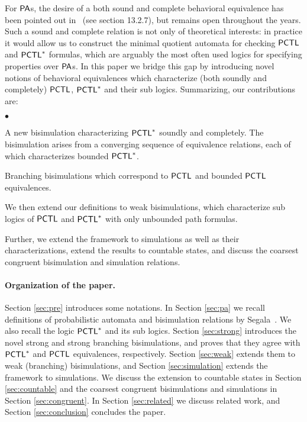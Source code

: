 \documentclass{LMCS}
\newcommand{\PA}{{\sf PA}}
\newcommand{\PCTL}{{\sf PCTL}}
\begin{document}
For $\PA$s, the desire of a both sound and complete behavioral
equivalence has been pointed out in~\cite{Segala-thesis} (see section
13.2.7), but remains open throughout the years.
Such a sound and complete relation is not only of theoretical interests: in practice
it would allow us to construct the minimal quotient automata for
checking $\PCTL$ and $\PCTL^{*}$ formulas, which are arguably the most often used
logics for specifying properties over $\PA$s.
 In this paper we bridge this gap by introducing novel
notions of behavioral equivalences which characterize (both soundly
and completely) $\PCTL$, $\PCTL^{*}$ and their sub logics.
Summarizing, our contributions are:
\begin{iteMize}{$\bullet$}
\item A new  bisimulation characterizing
$\PCTL^{*}$ soundly and completely. The bisimulation arises from a converging sequence of equivalence relations, each of which characterizes bounded $\PCTL^{*}$.
\item Branching bisimulations which correspond to $\PCTL$ and bounded
  $\PCTL$ equivalences.
\item We then extend our definitions to weak bisimulations, which characterize sub logics of $\PCTL$ and $\PCTL^{*}$ with only unbounded path formulas.
\item Further, we extend the
  framework to simulations as well as their characterizations,
extend the results to countable states, and discuss the coarsest congruent bisimulation  and simulation relations.
\end{iteMize}

\paragraph{Organization of the paper.}
Section \ref{sec:pre} introduces some notations. In Section \ref{sec:pa} we recall definitions of probabilistic automata and bisimulation relations by Segala~\cite{Segala-thesis}. We also recall the logic $\PCTL^{*}$ and its sub logics. Section \ref{sec:strong} introduces the novel strong and strong branching
bisimulations, and proves that they agree with $\PCTL^{*}$ and $\PCTL$
equivalences, respectively. Section \ref{sec:weak}  extends them to weak
(branching) bisimulations, and Section \ref{sec:simulation} extends the framework to simulations. We discuss the extension to countable states in Section \ref{sec:countable} and the coarsest congruent bisimulations  and simulations in Section \ref{sec:congruent}. In Section \ref{sec:related} we discuss
related work, and Section \ref{sec:conclusion} concludes the paper.
\end{document}
